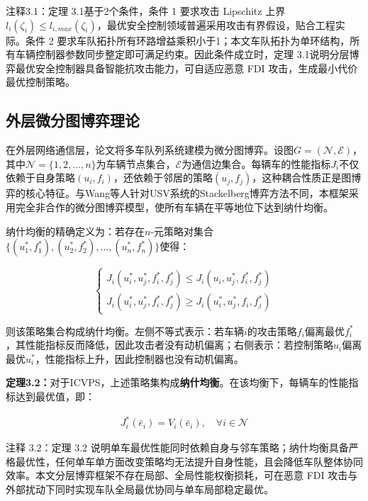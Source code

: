 \documentclass[10.5pt,a4paper,twoside,twocolumn]{ctexart}
\begin{document}
注释3.1：定理 3.1基于2个条件，条件 1 要求攻击 Lipschitz 上界\(l_{i}(\zeta_{i}) \leq l_{i, max }(\zeta_{i})\)，最优安全控制领域普遍采用攻击有界假设，贴合工程实际。条件 2 要求车队拓扑所有环路增益乘积小于1；本文车队拓扑为单环结构，所有车辆控制器参数同步整定即可满足约束。因此条件成立时，定理 3.1说明分层博弈最优安全控制器具备智能抗攻击能力，可自适应恶意 FDI 攻击，生成最小代价最优控制策略。

\subsection{\heiti{} 外层微分图博弈理论}

在外层网络通信层，论文将多车队列系统建模为微分图博弈。设图$G = (\mathcal{N}, \mathcal{E})$，其中$\mathcal{N} = \{1, 2, \dots, n\}$为车辆节点集合，$\mathcal{E}$为通信边集合。每辆车的性能指标$J_i$不仅依赖于自身策略$(u_i, f_i)$，还依赖于邻居的策略$(u_j, f_j)$，这种耦合性质正是图博弈的核心特征。与Wang等人\cite{wang2024}针对USV系统的Stackelberg博弈方法不同，本框架采用完全非合作的微分图博弈模型，使所有车辆在平等地位下达到纳什均衡。

纳什均衡的精确定义为：若存在$n$-元策略对集合$\{(u_1^*, f_1^*), (u_2^*, f_2^*), \dots, (u_n^*, f_n^*)\}$使得：

\begin{equation}
\begin{cases}
	J_i(u_i^*, u_j^*, f_i^*, f_j^*) \le J_i(u_i, u_j^*, f_i^*, f_j^*) \\
	J_i(u_i^*, u_j^*, f_i^*, f_j^*) \ge J_i(u_i^*, u_j^*, f_i, f_j^*)
\end{cases}
\label{eq:nash}
\end{equation}

则该策略集合构成纳什均衡。左侧不等式表示：若车辆$i$的攻击策略$f_i$偏离最优$f_i^*$，其性能指标反而降低，因此攻击者没有动机偏离；右侧表示：若控制策略$u_i$偏离最优$u_i^*$，性能指标上升，因此控制器也没有动机偏离。

\textbf{定理3.2：}对于ICVPS，上述策略集构成\textbf{纳什均衡}。在该均衡下，每辆车的性能指标达到最优值，即：

\begin{equation}
	\begin{aligned}
		J_i^*(\bar{e}_i) = V_i(\bar{e}_i), \quad \forall i \in \mathcal{N}
	\end{aligned}
	\label{eq:zb}
\end{equation}

注释 3.2：定理 3.2 说明单车最优性能同时依赖自身与邻车策略；纳什均衡具备严格最优性，任何单车单方面改变策略均无法提升自身性能，且会降低车队整体协同效率。本文分层博弈框架不存在局部、全局性能权衡损耗，可在恶意 FDI 攻击与外部扰动下同时实现车队全局最优协同与单车局部稳定最优。
\end{document}
